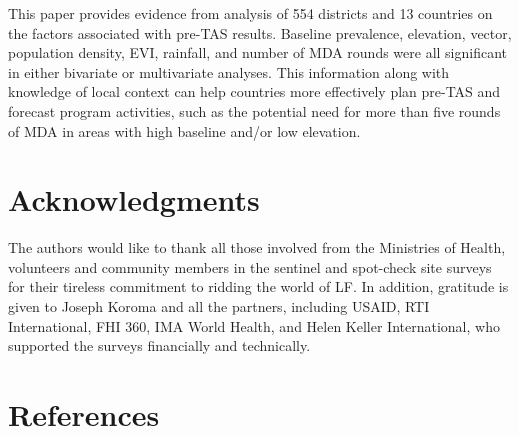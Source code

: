 \documentclass[11pt,a4paper]{article}
\begin{document}
This paper provides evidence from analysis of 554 districts and 13 countries on the factors associated with pre-TAS results. Baseline prevalence, elevation, vector, population density, EVI, rainfall, and number of MDA rounds were all significant in either bivariate or multivariate analyses. This information along with knowledge of local context can help countries more effectively plan pre-TAS and forecast program activities, such as the potential need for more than five rounds of MDA in areas with high baseline and/or low elevation.

\section{Acknowledgments}

The authors would like to thank all those involved from the Ministries of Health, volunteers and community members in the sentinel and spot-check site surveys for their tireless commitment to ridding the world of LF. In addition, gratitude is given to Joseph Koroma and all the partners, including USAID, RTI International, FHI 360, IMA World Health, and Helen Keller International, who supported the surveys financially and technically.

\section{References}
\end{document}
